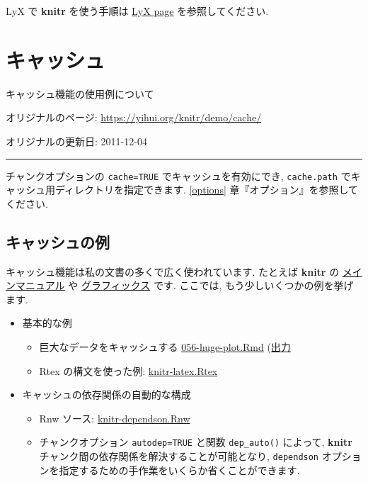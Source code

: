 \documentclass[
]{bxjsreport}
\providecommand{\tightlist}{%
  \setlength{\itemsep}{0pt}\setlength{\parskip}{0pt}}
\begin{document}
LyX で \textbf{knitr} を使う手順は
\href{https://yihui.org/knitr/demo/lyx/}{LyX page} を参照してください.

\hypertarget{cache}{%
\chapter*{キャッシュ}\label{cache}}

キャッシュ機能の使用例について

オリジナルのページ: \url{https://yihui.org/knitr/demo/cache/}

オリジナルの更新日: 2011-12-04

\begin{center}\rule{0.5\linewidth}{0.5pt}\end{center}

チャンクオプションの \texttt{cache=TRUE} でキャッシュを有効にでき,
\texttt{cache.path} でキャッシュ用ディレクトリを指定できます.
\ref{options} 章『オプション』を参照してください.

\hypertarget{ux30adux30e3ux30c3ux30b7ux30e5ux306eux4f8b}{%
\section*{キャッシュの例}\label{ux30adux30e3ux30c3ux30b7ux30e5ux306eux4f8b}}

キャッシュ機能は私の文書の多くで広く使われています. たとえば
\textbf{knitr} の \protect\hyperlink{manual}{メインマニュアル} や
\protect\hyperlink{graphics}{グラフィックス} です. ここでは,
もう少しいくつかの例を挙げます.

\begin{itemize}
\tightlist
\item
  基本的な例

  \begin{itemize}
  \tightlist
  \item
    巨大なデータをキャッシュする
    \href{https://github.com/yihui/knitr-examples/raw/master/056-huge-plot.Rmd}{056-huge-plot.Rmd}
    (\href{https://github.com/yihui/knitr-examples/blob/master/056-huge-plot.md}{出力}
  \item
    Rtex の構文を使った例:
    \href{https://github.com/yihui/knitr/blob/master/inst/examples/knitr-latex.Rtex}{knitr-latex.Rtex}
  \end{itemize}
\item
  キャッシュの依存関係の自動的な構成

  \begin{itemize}
  \tightlist
  \item
    Rnw ソース:
    \href{https://github.com/yihui/knitr-examples/blob/master/017-auto-dependson.Rnw}{knitr-dependson.Rnw}
  \item
    チャンクオプション \texttt{autodep=TRUE} と関数 \texttt{dep\_auto()}
    によって, \textbf{knitr}
    チャンク間の依存関係を解決することが可能となり, \texttt{dependson}
    オプションを指定するための手作業をいくらか省くことができます.
  \end{itemize}
\end{itemize}
\end{document}
